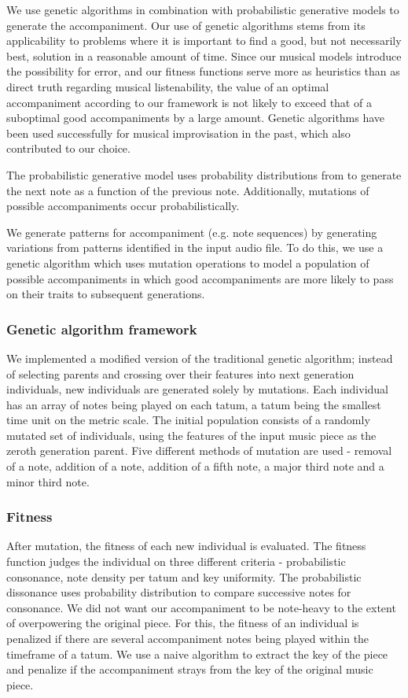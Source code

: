 \documentclass[11pt,conference,letterpaper]{IEEEtran}
\begin{document}
We use genetic algorithms in combination with probabilistic generative models to generate the accompaniment. Our use of genetic algorithms stems from its applicability to problems where it is important to find a good, but not necessarily best, solution in a reasonable amount of time. Since our musical models introduce the possibility for error, and our fitness functions serve more as heuristics than as direct truth regarding musical listenability, the value of an optimal accompaniment according to our framework is not likely to exceed that of a suboptimal good accompaniments by a large amount. Genetic algorithms have been used successfully for musical improvisation in the past, which also contributed to our choice.

The probabilistic generative model uses probability distributions from \cite{temperly2007mprob} to generate the next note as a function of the previous note. Additionally, mutations of possible accompaniments occur probabilistically.

We generate patterns for accompaniment (e.g. note sequences) by generating variations from patterns identified in the input audio file. To do this, we use a genetic algorithm which uses mutation operations to model a population of possible accompaniments in which good accompaniments are more likely to pass on their traits to subsequent generations.

\subsubsection{Genetic algorithm framework}

We implemented a modified version of the traditional genetic algorithm; instead of selecting parents and crossing over their features into next generation individuals, new individuals are generated solely by mutations. Each individual has an array of notes being played on each tatum, a tatum being the smallest time unit on the metric scale. The initial population consists of a randomly mutated set of individuals, using the features of the input music piece as the zeroth generation parent. Five different methods of mutation are used - removal of a note, addition of a note, addition of a fifth note, a major third note and a minor third note. 

\subsubsection{Fitness}

After mutation, the fitness of each new individual is evaluated. The fitness function judges the individual on three different criteria - probabilistic consonance, note density per tatum and key uniformity. The probabilistic dissonance uses probability distribution \cite{temperly2007mprob} to compare successive notes for consonance. We did not want our accompaniment to be note-heavy to the extent of overpowering the original piece. For this, the fitness of an individual is penalized if there are several accompaniment notes being played within the timeframe of a tatum. We use a naive algorithm to extract the key of the piece and penalize if the accompaniment strays from the key of the original music piece.
\end{document}
